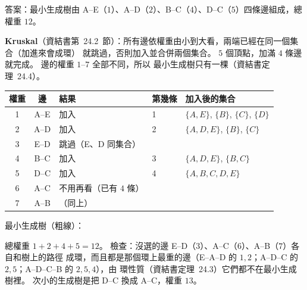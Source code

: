 \begin{pastsoln}
答案：最小生成樹由 A--E（$1$）、A--D（$2$）、B--C（$4$）、D--C（$5$）四條邊組成，總權重 $12$。

\textbf{Kruskal}（資結書第~24.2~節）：所有邊依權重由小到大看，兩端已經在同一個集合（加進來會成環）
就跳過，否則加入並合併兩個集合。 $5$ 個頂點，加滿 $4$ 條邊就完成。 邊的權重 $1$--$7$ 全部不同，所以
最小生成樹只有一棵（資結書定理~24.4）。
\begin{center}
\begin{tabular}{cclll}
\toprule
權重 & 邊 & 結果 & 第幾條 & 加入後的集合 \\
\midrule
1 & A--E & 加入 & 1 & $\{A, E\}$, $\{B\}$, $\{C\}$, $\{D\}$ \\
2 & A--D & 加入 & 2 & $\{A, D, E\}$, $\{B\}$, $\{C\}$ \\
3 & E--D & 跳過（E、D 同集合） & & \\
4 & B--C & 加入 & 3 & $\{A, D, E\}$, $\{B, C\}$ \\
5 & D--C & 加入 & 4 & $\{A, B, C, D, E\}$ \\
6 & A--C & 不用再看（已有 $4$ 條） & & \\
7 & A--B & （同上） & & \\
\bottomrule
\end{tabular}
\end{center}

最小生成樹（粗線）：
\begin{center}
\end{center}
總權重 $1 + 2 + 4 + 5 = 12$。 檢查：沒選的邊 E--D（$3$）、A--C（$6$）、A--B（$7$）各自和樹上的路徑
成環，而且都是那個環上最重的邊（E--A--D 的 $1, 2$；A--D--C 的 $2, 5$；A--D--C--B 的 $2, 5, 4$），由
環性質（資結書定理~24.3）它們都不在最小生成樹裡。 次小的生成樹是把 D--C 換成 A--C，權重 $13$。
\end{pastsoln}
